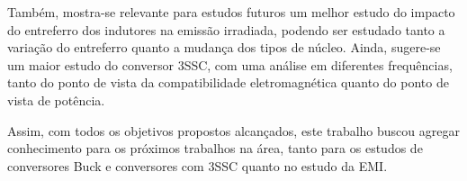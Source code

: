     Também, mostra-se relevante para estudos futuros um melhor estudo do impacto do entreferro dos indutores na emissão irradiada, podendo ser estudado tanto a variação do entreferro quanto a mudança dos tipos de núcleo. Ainda, sugere-se um maior estudo do conversor 3SSC, com uma análise em diferentes frequências, tanto do ponto de vista da compatibilidade eletromagnética quanto do ponto de vista de potência.
    
    Assim, com todos os objetivos propostos alcançados, este trabalho buscou agregar conhecimento para os próximos trabalhos na área, tanto para os estudos de conversores Buck \interleaved e conversores com 3SSC quanto no estudo da EMI.
    
    